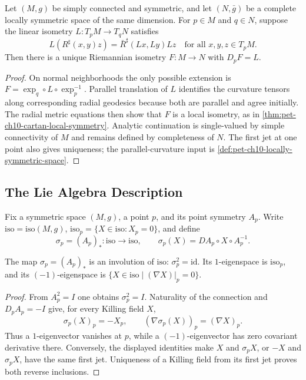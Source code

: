 \begin{theorem}
  \label{thm:pet-ch10-cartan-isometry-extension}

  Let $(M,g)$ be simply connected and symmetric, and let $(N,\bar g)$ be a
  complete locally symmetric space of the same dimension. For $p\in M$ and
  $q\in N$, suppose the linear isometry $L:T_pM\to T_qN$ satisfies
  \[
    L(R^\sharp(x,y)z)=\bar R^\sharp(Lx,Ly)Lz
    \quad\text{for all }x,y,z\in T_pM.
  \]
  Then there is a unique Riemannian isometry $F:M\to N$ with $D_pF=L$.
\end{theorem}
\begin{proof}
  \sketch
  On normal neighborhoods the only possible extension is
  $F=\exp_q\circ L\circ\exp_p^{-1}$. Parallel translation of $L$ identifies the
  curvature tensors along corresponding radial geodesics because both are
  parallel and agree initially. The radial metric equations then show that
  $F$ is a local isometry, as in
  \cref{thm:pet-ch10-cartan-local-symmetry}. Analytic continuation is
  single-valued by simple connectivity of $M$ and remains defined by
  completeness of $N$. The first jet at one point also gives uniqueness; the
  parallel-curvature input is \cref{def:pet-ch10-locally-symmetric-space}.
\end{proof}

\subsection{The Lie Algebra Description}

Fix a symmetric space $(M,g)$, a point $p$, and its point symmetry $A_p$. Write
$\mathrm{iso}=\mathrm{iso}(M,g)$,
$\mathrm{iso}_p=\{X\in\mathrm{iso}:X_p=0\}$, and define
\[
  \sigma_p=(A_p)_*:\mathrm{iso}\longrightarrow\mathrm{iso},\qquad
  \sigma_p(X)=DA_p\circ X\circ A_p^{-1}.
\]

\begin{proposition}
  \label{prop:pet-ch10-sigma-p-involution}

  The map $\sigma_p=(A_p)_*$ is an involution of $\mathrm{iso}$: $\sigma_p^2=\mathrm{id}$.
  Its $1$-eigenspace is $\mathrm{iso}_p$, and its $(-1)$-eigenspace is
  $\{X\in\mathrm{iso}\mid(\nabla X)|_p=0\}$.
\end{proposition}
\begin{proof}
  \sketch
  From $A_p^2=I$ one obtains $\sigma_p^2=I$. Naturality of the connection and
  $D_pA_p=-I$ give, for every Killing field $X$,
  \[
    \sigma_p(X)_p=-X_p,\qquad
    (\nabla\sigma_p(X))_p=(\nabla X)_p.
  \]
  Thus a $1$-eigenvector vanishes at $p$, while a $(-1)$-eigenvector has zero
  covariant derivative there. Conversely, the displayed identities make
  $X$ and $\sigma_pX$, or $-X$ and $\sigma_pX$, have the same first jet.
  Uniqueness of a Killing field from its first jet proves both reverse
  inclusions.
\end{proof}

